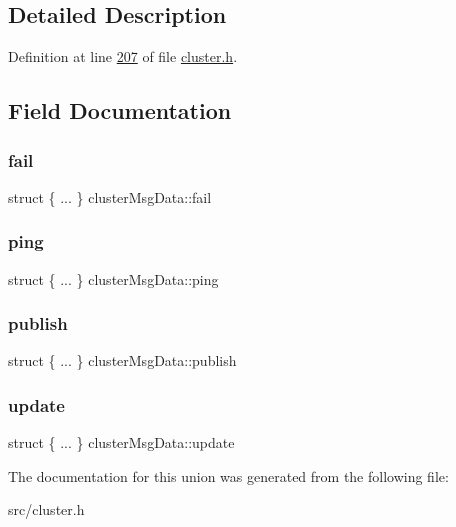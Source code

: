 \subsection{Detailed Description}


Definition at line \hyperlink{cluster_8h_source_l00207}{207} of file \hyperlink{cluster_8h_source}{cluster.\+h}.



\subsection{Field Documentation}
\mbox{\label{unionclusterMsgData_abad9fafed8c8896b318124af266e99ef}} 
\subsubsection{\texorpdfstring{fail}{fail}}
{\footnotesize\ttfamily struct \{ ... \}   cluster\+Msg\+Data\+::fail}

\mbox{\label{unionclusterMsgData_a7a5842b1f4b4e026c41a98768b5889f4}} 
\subsubsection{\texorpdfstring{ping}{ping}}
{\footnotesize\ttfamily struct \{ ... \}   cluster\+Msg\+Data\+::ping}

\mbox{\label{unionclusterMsgData_a3db1b1663d248a76e1a8bd88449b0823}} 
\subsubsection{\texorpdfstring{publish}{publish}}
{\footnotesize\ttfamily struct \{ ... \}   cluster\+Msg\+Data\+::publish}

\mbox{\label{unionclusterMsgData_af91b32a2f7cec8a5b3d4d32ed3685fbd}} 
\subsubsection{\texorpdfstring{update}{update}}
{\footnotesize\ttfamily struct \{ ... \}   cluster\+Msg\+Data\+::update}



The documentation for this union was generated from the following file\+:\begin{DoxyCompactItemize}
\item 
src/cluster.\+h\end{DoxyCompactItemize}
